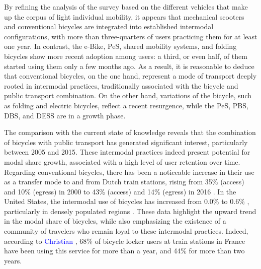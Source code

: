 \begin{refsegment}
By refining the analysis of the survey based on the different vehicles that make up the corpus of light individual mobility, it appears that mechanical scooters and conventional bicycles are integrated into established intermodal configurations, with more than three-quarters of users practicing them for at least one year. In contrast, the \acrfull{e-Bike}, \acrshort{PeS}, shared mobility systems, and folding bicycles show more recent adoption among users: a third, or even half, of them started using them only a few months ago. As a result, it is reasonable to deduce that conventional bicycles, on the one hand, represent a mode of transport deeply rooted in intermodal practices, traditionally associated with the bicycle and public transport combination. On the other hand, variations of the bicycle, such as folding and electric bicycles, reflect a recent resurgence, while the \acrshort{PeS}, \acrshort{PBS}, \acrshort{DBS}, and \acrshort{DESS} are in a growth phase.%

The comparison with the current state of knowledge reveals that the combination of bicycles with public transport has generated significant interest, particularly between 2005 and 2015. These intermodal practices indeed present potential for modal share growth, associated with a high level of user retention over time. Regarding conventional bicycles, there has been a noticeable increase in their use as a transfer mode to and from Dutch train stations, rising from 35\% (access) and 10\% (egress) in 2000 \textcolor{blue}{\autocite[73]{rietveld_accessibility_2000}} to 43\% (access) and 14\% (egress) in 2016 \textcolor{blue}{\autocite[456-457]{jonkeren_bicycle-train_2021}}. In the United States, the intermodal use of bicycles has increased from 0.0\% to 0.6\% \textcolor{blue}{\autocite[101]{wang_bicycle-transit_2013}}, particularly in densely populated regions \textcolor{blue}{\autocite[107]{wang_bicycle-transit_2013}}. These data highlight the upward trend in the modal share of bicycles, while also emphasizing the existence of a community of travelers who remain loyal to these intermodal practices. Indeed, according to \textcolor{blue}{Christian} \textcolor{blue}{\textcite[18]{gioria_etude_2016}}, 68\% of bicycle locker users at train stations in France have been using this service for more than a year, and 44\% for more than two years.%


\end{refsegment}
